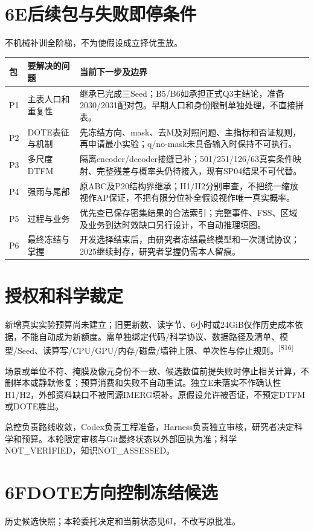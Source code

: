 \documentclass[UTF8,10.5pt,a4paper,fontset=none]{ctexart}
\newcommand{\evi}[1]{\textsuperscript{\color{muted}[#1]}}
\newcommand{\pageheading}[2]{\clearpage\section*{#1}\textcolor{muted}{#2}\par\vspace{3pt}}
\begin{document}
\pageheading{6E\quad 后续包与失败即停条件}{不机械补训全阶梯，不为使假设成立择优重放。}
\begin{tabularx}{\textwidth}{@{}p{1.1cm}p{3.5cm}>{\raggedright\arraybackslash}X@{}}
\toprule 包 & 要解决的问题 & 当前下一步及边界\\\midrule
P1 & 主表人口和重复性 & 继承已完成三Seed；B5/B6如承担正式Q3主结论，准备2030/2031配对包。早期人口和身份限制单独处理，不直接拼表。\\
P2 & DOTE表征与机制 & 先冻结方向、mask、去M及对照问题、主指标和否证规则，再申请最小实验；q/no-mask未具备输入时保持不可执行。\\
P3 & 多尺度DTFM & 隔离encoder/decoder接缝已补；501/251/126/63真实条件映射、完整残差与概率头仍待接入，现有SP04结果不可代替。\\
P4 & 强雨与尾部 & 原ABC及P20结构界继承；H1/H2分别审查，不把统一缩放视作AP保证，不把有限分位补全假设视作唯一真实概率。\\
P5 & 过程与业务 & 优先查已保存密集结果的合法索引；完整事件、FSS、区域及业务到达时效缺口另行设计，不自动推理填图。\\
P6 & 最终冻结与掌握 & 开发选择结束后，由研究者冻结最终模型和一次测试协议；2025继续封存，研究者掌握仍需本人留痕。\\
\bottomrule
\end{tabularx}

\section*{授权和科学裁定}
新增真实实验预算尚未建立；旧更新数、读字节、6小时或24GiB仅作历史成本依据，不能自动成为新额度。需单独绑定代码/科学协议、数据路径及清单、模型/Seed、读算写/CPU/GPU/内存/磁盘/墙钟上限、单次性与停止规则。\evi{S16}

场景或单位不符、掩膜及像元身份不一致、候选数值前提失败时停止相关计算，不删样本或静默修复；预算消费和失败不自动重试。独立E未落实不作确认性H1/H2，外部资料缺口不被同源IMERG填补。原假设允许被否证，不预定DTFM或DOTE胜出。

总控负责路线收敛，Codex负责工程准备，Harness负责独立审核，研究者决定科学和预算。本轮限定审核与Git最终状态以外部回执为准；科学NOT\_VERIFIED，知识NOT\_ASSESSED。

\pageheading{6F\quad DOTE方向控制冻结候选}{历史候选快照；本轮委托决定和当前状态见6I，不改写原批准。}
\end{document}
